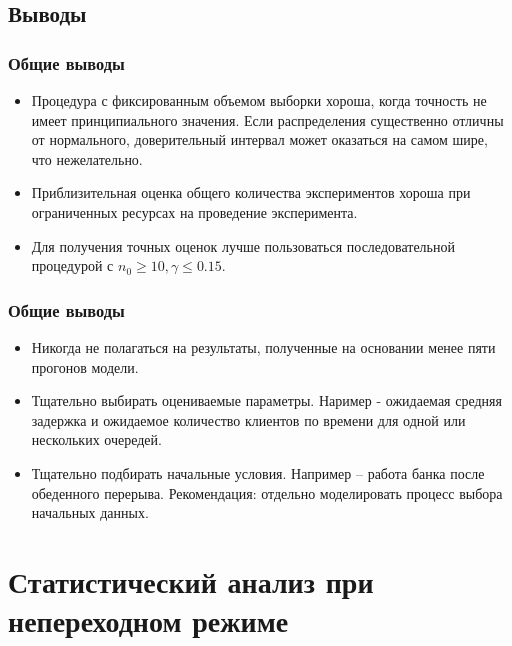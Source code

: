 \documentclass[utf8]{beamer}
\begin{document}
\subsection{Выводы}
\begin{frame}
\frametitle{Общие выводы}
\begin{itemize}
  \item Процедура с фиксированным объемом выборки хороша, когда
  точность не имеет принципиального значения. Если распределения
  существенно отличны от нормального, доверительный интервал может
  оказаться на самом шире, что нежелательно.
  \item Приблизительная оценка общего количества экспериментов хороша
  при ограниченных ресурсах на проведение эксперимента.
  \item Для получения точных оценок лучше пользоваться последовательной
  процедурой с $n_0 \geq 10, \gamma \leq 0.15$.
\end{itemize}
\end{frame}
\begin{frame}
\frametitle{Общие выводы}
\begin{itemize}
  \item Никогда не полагаться на результаты, полученные на основании
  менее пяти прогонов модели.
  \item Тщательно выбирать оцениваемые параметры. Наример - ожидаемая
  средняя задержка и ожидаемое количество клиентов по времени для
  одной или нескольких очередей.
  \item Тщательно подбирать начальные условия. Например -- работа
  банка после обеденного перерыва. Рекомендация: отдельно моделировать
  процесс выбора начальных данных.
\end{itemize}
\end{frame}

\section{Статистический анализ при непереходном режиме}
\end{document}
